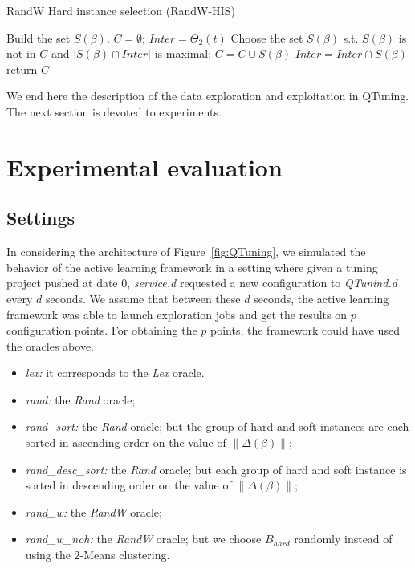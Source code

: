 \documentclass[10pt, conference, compsocconf]{IEEEtran}
\newcommand{\norm}[1]{\left\lVert#1\right\rVert}
\begin{document}
	\begin{algorithm}                    
	\caption{\scriptsize RandW Hard instance selection (RandW-HIS)} 	\label{alg4}  
	\begin{algorithmic}[1]
	\scriptsize
	\STATE Build the set $S(\beta)$.
	\ENDFOR
	\STATE $C = \emptyset$; $Inter = \Theta_2(t)$
		\STATE Choose the set $S(\beta)$ s.t. $S(\beta)$ is not in $C$ and $|S(\beta) \cap Inter|$ is maximal;
		\STATE $C  = C \cup S(\beta)$
                \STATE $Inter = Inter \cap S(\beta)$
	\ENDWHILE
	\STATE return $C$
	\end{algorithmic}
	\end{algorithm}
	\normalsize

        We end here the description of the data exploration and
        exploitation in QTuning. The next section is devoted to
        experiments.


\section{Experimental evaluation} \label{Proof-of-concept}

\subsection{Settings}
In considering the architecture of Figure~\ref{fig:QTuning}, we simulated the behavior of 
the active learning framework in a setting where given a tuning project pushed at date $0$,  
{\it service.d} requested a new configuration to {\it QTunind.d} every $d$ seconds. 
We assume that between these $d$ seconds, the active learning framework was able to launch exploration 
jobs and get the results on $p$ configuration points. For obtaining the $p$ points, the framework 
could have used the oracles above.
\begin{itemize}
\item {\it lex:} it corresponds to the {\it Lex} oracle.
\item {\it rand:} the {\it Rand} oracle;
\item {\it rand\_sort:} the {\it Rand} oracle; but the group of hard and soft instances are each sorted in ascending order on the value of $\norm{\Delta(\beta)}$;
\item {\it rand\_desc\_sort:} the {\it Rand} oracle; but each group of hard and soft instance is sorted in descending order on the value of $\norm{\Delta(\beta)}$;
\item {\it rand\_w:} the {\it RandW} oracle;
\item {\it rand\_w\_noh:} the {\it RandW} oracle; but we choose $B_{hard}$ randomly instead of using the $2$-Means clustering.
\end{itemize}
\end{document}
